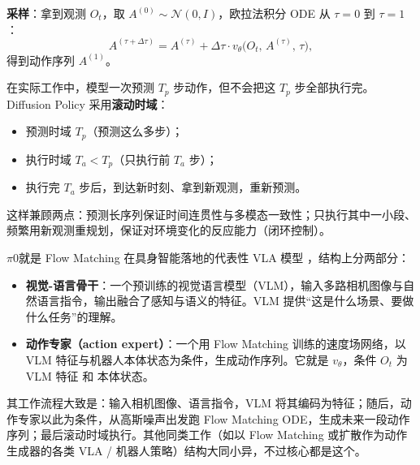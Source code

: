 \textbf{采样}：拿到观测 $O_t$，取 $A^{(0)}\sim\mathcal N(0,I)$，欧拉法积分 ODE 从 $\tau=0$ 到 $\tau=1$：
\begin{equation}
A^{(\tau+\Delta\tau)} = A^{(\tau)} + \Delta\tau\cdot v_\theta\big(O_t,\, A^{(\tau)},\, \tau\big),
\end{equation}
得到动作序列 $A^{(1)}$。

在实际工作中，模型一次预测 $T_p$ 步动作，但不会把这 $T_p$ 步全部执行完。Diffusion Policy 采用\textbf{滚动时域}：
\begin{itemize}
\item 预测时域 $T_p$（预测这么多步）；
\item 执行时域 $T_a < T_p$（只执行前 $T_a$ 步）；
\item 执行完 $T_a$ 步后，到达新时刻、拿到新观测，重新预测。
\end{itemize}
这样兼顾两点：预测长序列保证时间连贯性与多模态一致性；只执行其中一小段、频繁用新观测重规划，保证对环境变化的反应能力（闭环控制）。

\textbf{$\pi0$}就是 Flow Matching 在具身智能落地的代表性 VLA 模型 \cite{black2026pi0visionlanguageactionflowmodel}，结构上分两部分：
\begin{itemize}
\item \textbf{视觉-语言骨干}：一个预训练的视觉语言模型（VLM），输入多路相机图像与自然语言指令，输出融合了感知与语义的特征。VLM 提供“这是什么场景、要做什么任务”的理解。
\item \textbf{动作专家（action expert）}：一个用 Flow Matching 训练的速度场网络，以 VLM 特征与机器人本体状态为条件，生成动作序列。它就是 $v_\theta$，条件 $O_t$ 为VLM 特征 和 本体状态。
\end{itemize}
其工作流程大致是：输入相机图像、语言指令，VLM 将其编码为特征；随后，动作专家以此为条件，从高斯噪声出发跑 Flow Matching ODE，生成未来一段动作序列；最后滚动时域执行。其他同类工作（如以 Flow Matching 或扩散作为动作生成器的各类 VLA / 机器人策略）结构大同小异，不过核心都是这个。